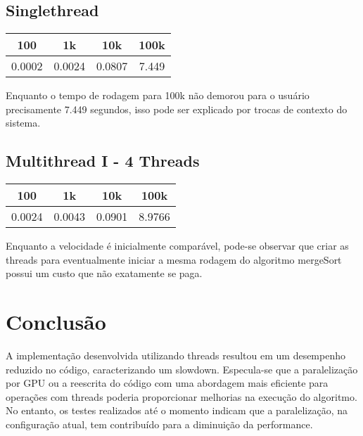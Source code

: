 \documentclass{article}
\begin{document}
\subsection{Singlethread}
    
    \begin{center}
        \begin{tabular}{||c c c c||} 
         \hline
         100 & 1k & 10k & 100k \\ [0.5ex] 
         \hline\hline
         0.0002 & 0.0024 & 0.0807 & 7.449 \\
         \hline
        \end{tabular}
    \end{center}
Enquanto o tempo de rodagem para 100k não demorou para o usuário precisamente 7.449 segundos, isso pode ser explicado por trocas de contexto do sistema.

\subsection{Multithread I - 4 Threads}
    \begin{center}
        \begin{tabular}{||c c c c||} 
         \hline
         100 & 1k & 10k & 100k \\ [0.5ex] 
         \hline\hline
         0.0024 & 0.0043 & 0.0901 & 8.9766 \\
         \hline
        \end{tabular}
    \end{center}

Enquanto a velocidade é inicialmente comparável, pode-se observar que criar as threads para eventualmente iniciar a mesma rodagem do algoritmo mergeSort possui um custo que não exatamente se paga.\\

\section{Conclusão}

A implementação desenvolvida utilizando threads resultou em um desempenho reduzido no código, caracterizando um slowdown. Especula-se que a paralelização por GPU ou a reescrita do código com uma abordagem mais eficiente para operações com threads poderia proporcionar melhorias na execução do algoritmo. No entanto, os testes realizados até o momento indicam que a paralelização, na configuração atual, tem contribuído para a diminuição da performance.
\end{document}
